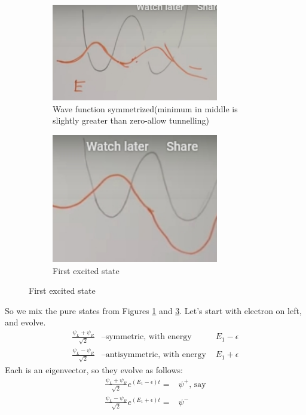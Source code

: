 \documentclass[]{article}
\begin{document}
\begin{figure}[H]
	\caption{Wave functions for Figure \ref{fig:double:well}}
	\begin{subfigure}{0.45\textwidth}
			\caption{Wave function symmetrized(minimum in middle is slightly greater than zero-allow tunnelling)}\label{fig:double:well:symmetrized}
			\includegraphics[width=0.8\textwidth]{particle_mixed_symmetrized}
	\end{subfigure}
	\begin{subfigure}{0.45\textwidth}
		\caption{First excited state}\label{fig:double:well:1st}
		\includegraphics[width=0.8\textwidth]{particle_mixed_1st_excited}
	\end{subfigure}
\end{figure}


So we mix the pure states from Figures \ref{fig:double:well:symmetrized} and \ref{fig:double:well:1st}. Let's start with electron on left, and evolve.
\begin{align*}
\frac{\psi_L+\psi_R}{\sqrt{2}}& \text{--symmetric, with energy }& E_1-\epsilon\\
\frac{\psi_L-\psi_R}{\sqrt{2}}& \text{--antisymmetric, with energy }& E_1+\epsilon
\end{align*}
Each is an eigenvector, so they evolve as follows:
\begin{align*}
\frac{\psi_L+\psi_R}{\sqrt{2}} e^{(E_1-\epsilon)t}=&\psi^+ \text{, say}\\
\frac{\psi_L-\psi_R}{\sqrt{2}}e^{(E_1+\epsilon)t}=&\psi^-
\end{align*}
\end{document}
